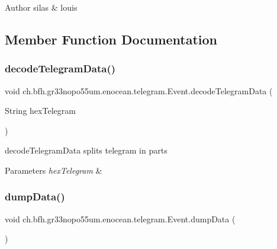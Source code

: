 \begin{DoxyAuthor}{Author}
silas \& louis 
\end{DoxyAuthor}


\subsection{Member Function Documentation}
\hypertarget{classch_1_1bfh_1_1gr33nopo55um_1_1enocean_1_1telegram_1_1_event_a9bada0cdd98d25a854a7d7382b60405f}{}\label{classch_1_1bfh_1_1gr33nopo55um_1_1enocean_1_1telegram_1_1_event_a9bada0cdd98d25a854a7d7382b60405f} 
\subsubsection{\texorpdfstring{decode\+Telegram\+Data()}{decodeTelegramData()}}
{\footnotesize\ttfamily void ch.\+bfh.\+gr33nopo55um.\+enocean.\+telegram.\+Event.\+decode\+Telegram\+Data (\begin{DoxyParamCaption}\item[{String}]{hex\+Telegram }\end{DoxyParamCaption})}

decode\+Telegram\+Data splits telegram in parts


\begin{DoxyParams}{Parameters}
{\em hex\+Telegram} & \\
\hline
\end{DoxyParams}
\hypertarget{classch_1_1bfh_1_1gr33nopo55um_1_1enocean_1_1telegram_1_1_event_a80e90c4fa91b58ad64af318551b9b7a0}{}\label{classch_1_1bfh_1_1gr33nopo55um_1_1enocean_1_1telegram_1_1_event_a80e90c4fa91b58ad64af318551b9b7a0} 
\subsubsection{\texorpdfstring{dump\+Data()}{dumpData()}}
{\footnotesize\ttfamily void ch.\+bfh.\+gr33nopo55um.\+enocean.\+telegram.\+Event.\+dump\+Data (\begin{DoxyParamCaption}{ }\end{DoxyParamCaption})}

